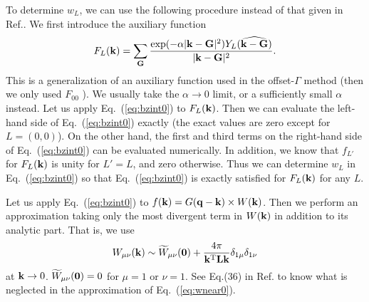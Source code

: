 \documentclass[a4paper,10pt,epsf,fleqn]{article}
\newcommand{\bfzero}{{\bf 0}}
\newcommand{\bfq}{{\bf q}}
\newcommand{\bfk}{{\bf k}}
\newcommand{\bfG}{{\bf G}}
\newcommand{\req}[1]{\mbox{Eq.~(\ref{#1})}}
\begin{document}
To determine $w_L$, 
we can use the following procedure instead of that given 
in Ref.\cite{freysoldt_dielectric_2007}.
We first introduce the auxiliary function  
\begin{eqnarray}
F_L(\bfk) =\sum_{\bfG} \frac{\exp(- \alpha
 |\bfk-\bfG|^2)Y_L(\widehat{\bfk-\bfG})}{|\bfk-\bfG|^2}.
\end{eqnarray}
This is a generalization of an auxiliary function used in the 
offset-$\Gamma$ method (then we only used $F_{00}$ \cite{kotani_quasiparticle_2007}).
We usually take the $\alpha \to 0$ limit, or a sufficiently small $\alpha$ instead.
Let us apply \req{eq:bzint0} to $F_L(\bfk)$.
Then we can evaluate the left-hand side of \req{eq:bzint0}
exactly (the exact values are zero except for $L=(0,0)$). 
On the other hand, the first and 
third terms on the right-hand side of \req{eq:bzint0}
can be evaluated numerically.
In addition, we know that $f_{L'}$ for $F_L(\bfk)$ is unity for $L'=L$,
and zero otherwise.
Thus we can determine $w_L$ in \req{eq:bzint0}
so that \req{eq:bzint0} is exactly satisfied for $F_L(\bfk)$ for any $L$.


Let us apply \req{eq:bzint0} to $f(\bfk)=G(\bfq-\bfk) \times W(\bfk)$.
Then we perform an approximation taking only the most divergent term 
in $W(\bfk)$ in addition to its analytic part. That is, we use
\begin{eqnarray}
W_{\mu \nu}(\bfk) \sim \widetilde{W}_{\mu \nu}(\bfzero) +
 \frac{4 \pi}{\bfk^{\rm T} {\bf L} \bfk}
 \delta_{1\mu}\delta_{1\nu}
\label{eq:wnear0}
\end{eqnarray}
at $\bfk \to 0$. 
$\widetilde{W}_{\mu \nu}(\bfzero)=0$ for $\mu=1$ or $\nu=1$. 
See Eq.(36) in Ref.\cite{friedrich_efficient_2010} to know what is
neglected in the approximation of \req{eq:wnear0}.
\end{document}

